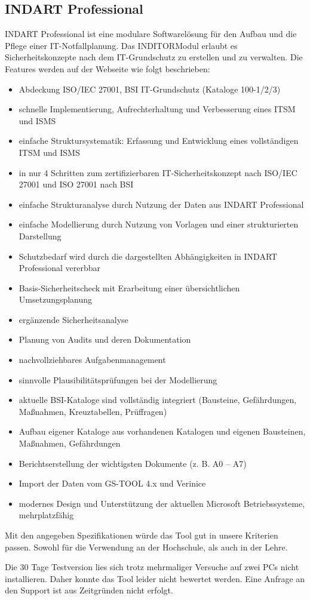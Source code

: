 \subsection{INDART Professional}
INDART Professional ist eine modulare Softwarelösung für den Aufbau und die Pflege einer IT-Notfallplanung. Das INDITOR\textregistered Modul erlaubt es Sicherheitskonzepte nach dem IT-Grundschutz zu erstellen und zu verwalten.
Die Features werden auf der Webseite \cite{indart} wie folgt beschrieben:

\begin{itemize}
\itemsep0em
\item Abdeckung ISO/IEC 27001, BSI IT-Grundschutz (Kataloge 100-1/2/3)
\item schnelle Implementierung, Aufrechterhaltung und Verbesserung eines ITSM und ISMS
\item einfache Struktursystematik: Erfassung und Entwicklung eines vollständigen ITSM und ISMS
\item in nur 4 Schritten zum zertifizierbaren IT-Sicherheitskonzept nach ISO/IEC 27001 und ISO 27001 nach BSI
\item einfache Strukturanalyse durch Nutzung der Daten aus INDART Professional\textregistered
\item einfache Modellierung durch Nutzung von Vorlagen und einer strukturierten Darstellung
\item Schutzbedarf wird durch die dargestellten Abhängigkeiten in INDART Professional\textregistered{} vererbbar
\item Basis-Sicherheitscheck mit Erarbeitung einer übersichtlichen Umsetzungsplanung
\item ergänzende Sicherheitsanalyse
\item Planung von Audits und deren Dokumentation
\item nachvollziehbares Aufgabenmanagement
\item sinnvolle Plausibilitätsprüfungen bei der Modellierung
\item aktuelle BSI-Kataloge sind vollständig integriert (Bausteine, Gefährdungen, Maßnahmen, Kreuztabellen, Prüffragen)
\item Aufbau eigener Kataloge aus vorhandenen Katalogen und eigenen Bausteinen, Maßnahmen, Gefährdungen
\item Berichtserstellung der wichtigsten Dokumente (z. B. A0 – A7)
\item Import der Daten vom GS-TOOL 4.x und Verinice
\item modernes Design und Unterstützung der aktuellen Microsoft Betriebssysteme, mehrplatzfähig
\end{itemize}

Mit den angegeben Spezifikationen würde das Tool gut in unsere Kriterien passen. Sowohl für die Verwendung an der Hochschule, als auch in der Lehre.

Die 30 Tage Testversion lies sich trotz mehrmaliger Versuche auf zwei PCs nicht installieren. Daher konnte das Tool leider nicht bewertet werden. Eine Anfrage an den Support ist aus Zeitgründen nicht erfolgt.